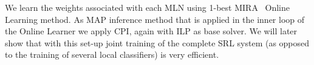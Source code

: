 We learn the weights associated with each MLN using 1-best MIRA~\citep{crammer01ultraconservative} Online Learning method. As MAP inference method that is applied in the inner loop of the Online Learner we apply CPI, again with ILP as base solver. We will later show that with this set-up joint training of the complete SRL system (as opposed to the training of several local classifiers) is very efficient.  


